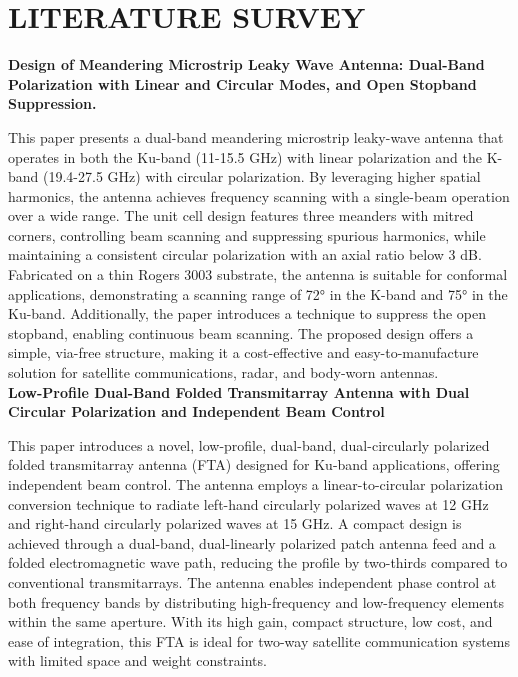 \documentclass[12pt]{article}
\begin{document}
\newpage
\section{LITERATURE SURVEY}

\noindent \textbf{Design of Meandering Microstrip Leaky Wave Antenna: Dual-Band Polarization with Linear and Circular Modes, and Open Stopband Suppression.}
\par This paper presents a dual-band meandering microstrip leaky-wave antenna that operates in both the Ku-band (11-15.5 GHz) with linear polarization and the K-band (19.4-27.5 GHz) with circular polarization. By leveraging higher spatial harmonics, the antenna achieves frequency scanning with a single-beam operation over a wide range. The unit cell design features three meanders with mitred corners, controlling beam scanning and suppressing spurious harmonics, while maintaining a consistent circular polarization with an axial ratio below 3 dB. Fabricated on a thin Rogers 3003 substrate, the antenna is suitable for conformal applications, demonstrating a scanning range of 72° in the K-band and 75° in the Ku-band. Additionally, the paper introduces a technique to suppress the open stopband, enabling continuous beam scanning. The proposed design offers a simple, via-free structure, making it a cost-effective and easy-to-manufacture solution for satellite communications, radar, and body-worn antennas.\\

\noindent \textbf{Low-Profile Dual-Band Folded Transmitarray Antenna with Dual Circular Polarization and Independent Beam Control}
\par This paper introduces a novel, low-profile, dual-band, dual-circularly polarized folded transmitarray antenna (FTA) designed for Ku-band applications, offering independent beam control. The antenna employs a linear-to-circular polarization conversion technique to radiate left-hand circularly polarized waves at 12 GHz and right-hand circularly polarized waves at 15 GHz. A compact design is achieved through a dual-band, dual-linearly polarized patch antenna feed and a folded electromagnetic wave path, reducing the profile by two-thirds compared to conventional transmitarrays. The antenna enables independent phase control at both frequency bands by distributing high-frequency and low-frequency elements within the same aperture. With its high gain, compact structure, low cost, and ease of integration, this FTA is ideal for two-way satellite communication systems with limited space and weight constraints.\\
\end{document}

